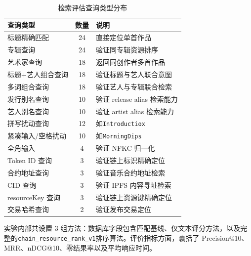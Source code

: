 \begin{table}[htbp]
    \linespread{1.45}
    \songti
    \centering
    \caption{检索评估查询类型分布}\label{tab:ranking_query_categories}
    \begin{tabular}{|l|c|l|}
        \hline
        查询类型           & 数量 & 说明                                      \\ \hline
        标题精确匹配         & 24 & 直接定位单首作品                                \\ \hline
        专辑查询           & 24 & 验证同专辑资源排序                               \\ \hline
        艺术家查询          & 18 & 返回同创作者多首作品                              \\ \hline
        标题+艺人组合查询      & 18 & 验证标题与艺人联合意图                            \\ \hline
        多词组合查询         & 18 & 验证艺人与专辑联合检索                            \\ \hline
        发行别名查询         & 10 & 验证 release alias 检索能力                   \\ \hline
        艺人别名查询         & 10 & 验证 artist alias 检索能力                    \\ \hline
        拼写扰动查询         & 12 & 如\texttt{Introductiox}                       \\ \hline
        紧凑输入/空格扰动      & 10 & 如\texttt{MorningDips}                      \\ \hline
        全角输入           & 4  & 验证 NFKC 归一化                            \\ \hline
        Token ID 查询    & 3  & 验证链上标识精确定位                              \\ \hline
        合约地址查询         & 3  & 验证音乐合约地址检索                              \\ \hline
        CID 查询         & 3  & 验证 IPFS 内容寻址检索                         \\ \hline
        resourceKey 查询 & 3  & 验证链上资源键精确定位                             \\ \hline
        交易哈希查询         & 2  & 验证发布交易定位                                \\ \hline
    \end{tabular}
\end{table}

实验内部共设置 3 组方法：数据库字段包含匹配基线、仅文本评分方法，以及完整的\texttt{chain\_resource\_rank\_v1}排序算法。评价指标方面，囊括了 Precision@10、MRR、nDCG@10、零结果率以及平均响应时间。


